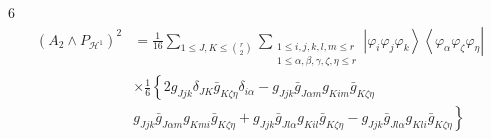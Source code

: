 \documentclass[aps,preprint]{revtex4}%
\begin{document}
6%
\begin{align}
\left(  A_{2}\wedge P_{\mathcal{H}^{1}}\right)  ^{2} &  =\frac{1}{16}%
\sum_{1\leq J,K\leq\binom{r}{2}}\sum_{\substack{1\leq i,j,k,l,m\leq
r\\1\leq\alpha,\beta,\gamma,\zeta,\eta\leq r}}\left\vert \varphi_{i}%
\varphi_{j}\varphi_{k}\right\rangle \left\langle \varphi_{\alpha}%
\varphi_{\zeta}\varphi_{\eta}\right\vert \\
&  \times\frac{1}{6}\left\{  2g_{Jjk}\delta_{JK}\bar{g}_{K\zeta\eta}%
\delta_{i\alpha}-g_{Jjk}\bar{g}_{J\alpha m}g_{Kim}\bar{g}_{K\zeta\eta}\right.
\\
&  \left.  g_{Jjk}\bar{g}_{J\alpha m}g_{Kmi}\bar{g}_{K\zeta\eta}+g_{Jjk}%
\bar{g}_{Jl\alpha}g_{Kil}\bar{g}_{K\zeta\eta}-g_{Jjk}\bar{g}_{Jl\alpha}%
g_{Kli}\bar{g}_{K\zeta\eta}\right\}
\end{align}
\end{document}
